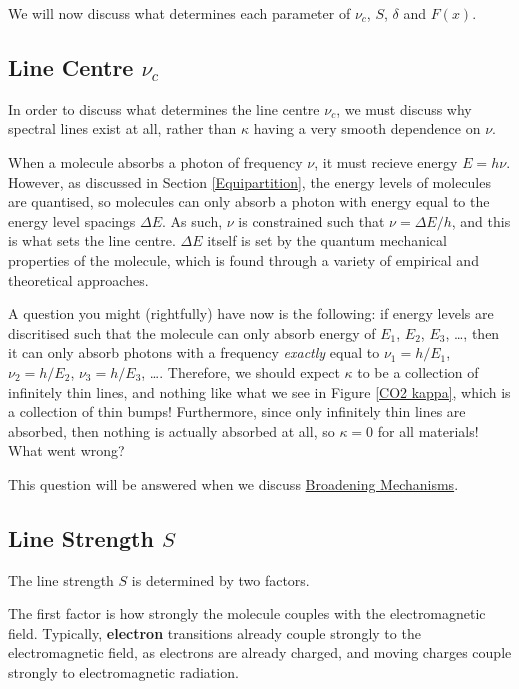 We will now discuss what determines each parameter of $\nu_c$, $S$, $\delta$ and $F(x)$.

\subsection{Line Centre\texorpdfstring{ $\nu_c$}{}}

In order to discuss what determines the line centre $\nu_c$, we must discuss why spectral lines exist at all, rather than $\kappa$ having a very smooth dependence on $\nu$.

When a molecule absorbs a photon of frequency $\nu$, it must recieve energy $E=h\nu$. However, as discussed in Section \ref{Equipartition}, the energy levels of molecules are quantised, so molecules can only absorb a photon with energy equal to the energy level spacings $\Delta E$. As such, $\nu$ is constrained such that $\nu=\Delta E/h$, and this is what sets the line centre. $\Delta E$ itself is set by the quantum mechanical properties of the molecule, which is found through a variety of empirical and theoretical approaches.

A question you might (rightfully) have now is the following: if energy levels are discritised such that the molecule can only absorb energy of $E_1$, $E_2$, $E_3$, \ldots, then it can only absorb photons with a frequency \textit{exactly} equal to $\nu_1=h/E_1$, $\nu_2=h/E_2$, $\nu_3=h/E_3$, \ldots. Therefore, we should expect $\kappa$ to be a collection of infinitely thin lines, and nothing like what we see in Figure \ref{CO2 kappa}, which is a collection of thin bumps! Furthermore, since only infinitely thin lines are absorbed, then nothing is actually absorbed at all, so $\kappa=0$ for all materials! What went wrong?

This question will be answered when we discuss \hyperref[Broadening]{Broadening Mechanisms}.

\subsection{Line Strength\texorpdfstring{ $S$}{}}

The line strength $S$ is determined by two factors.

The first factor is how strongly the molecule couples with the electromagnetic field. Typically, \textbf{electron} transitions already couple strongly to the electromagnetic field, as electrons are already charged, and moving charges couple strongly to electromagnetic radiation.

